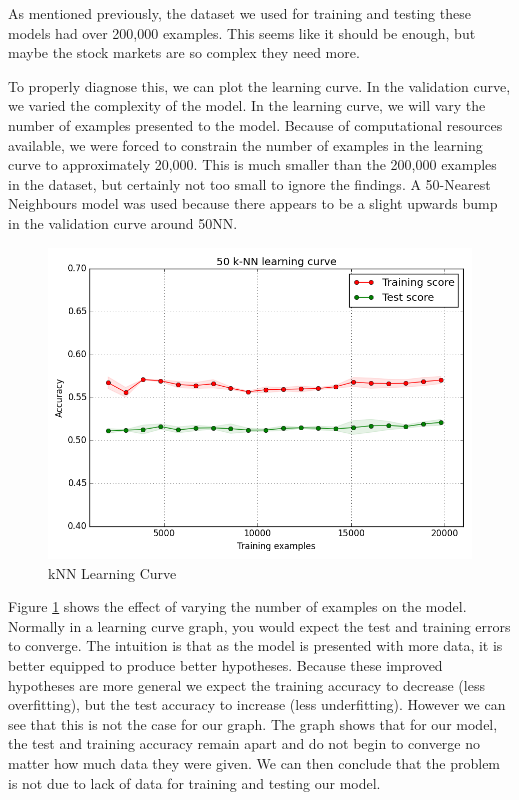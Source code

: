 \documentclass{report}
\begin{document}
As mentioned previously, the dataset we used for training and testing these models had over 200,000 examples. This seems like it should be enough, but maybe the stock markets are so complex they need more.

To properly diagnose this, we can plot the learning curve. In the validation curve, we varied the complexity of the model. In the learning curve, we will vary the number of examples presented to the model. Because of computational resources available, we were forced to constrain the number of examples in the learning curve to approximately 20,000. This is much smaller than the 200,000 examples in the dataset, but certainly not too small to ignore the findings. A 50-Nearest Neighbours model was used because there appears to be a slight upwards bump in the validation curve around 50NN.

\begin{figure}[H]
	\caption{kNN Learning Curve}
	\centerline{\includegraphics[width=\textwidth]{vis/50-learning-curve-20000.png}}
	\label{fig:knn-learning}
\end{figure}

Figure \ref{fig:knn-learning} shows the effect of varying the number of examples on the model. Normally in a learning curve graph, you would expect the test and training errors to converge. The intuition is that as the model is presented with more data, it is better equipped to produce better hypotheses. Because these improved hypotheses are more general we expect the training accuracy to decrease (less overfitting), but the test accuracy to increase (less underfitting). However we can see that this is not the case for our graph. The graph shows that for our model, the test and training accuracy remain apart and do not begin to converge no matter how much data they were given. We can then conclude that the problem is not due to lack of data for training and testing our model.
\end{document}
